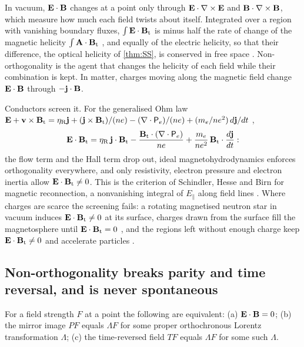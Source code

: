 In vacuum, $\mathbf E\cdot\mathbf B$ changes at a point only through $\mathbf E\cdot\nabla\times\mathbf E$ and $\mathbf B\cdot\nabla\times\mathbf B$, which measure how much each field
twists about itself. Integrated over a region with vanishing boundary fluxes, $\int\mathbf E\cdot\mathbf B_{\rm t}$ is minus half the rate of change of
the magnetic helicity $\int\mathbf A\cdot\mathbf B_{\rm t}$ \cite{Woltjer58,BergerField84}, and equally of the electric helicity, so that their
difference, the optical helicity of \cref{thm:SS}, is conserved in free space \cite{Calkin65,CameronBarnettYao12}. Non-orthogonality
is the agent that changes the helicity of each field while their combination is kept. In matter, charges moving along the magnetic field
change $\mathbf E\cdot\mathbf B$ through $-\mathbf j\cdot\mathbf B$.

Conductors screen it. For the generalised Ohm law
$\mathbf E+\mathbf v\times\mathbf B_{\rm t}=\eta_{\rm R}\mathbf j+(\mathbf j\times\mathbf B_{\rm t})/(ne)-(\nabla\cdot\mathsf P_e)/(ne)+(m_e/ne^2)\,d\mathbf j/dt$ \cite{PriestForbes},
\[
\mathbf E\cdot\mathbf B_{\rm t}=\eta_{\rm R}\,\mathbf j\cdot\mathbf B_{\rm t}-\frac{\mathbf B_{\rm t}\cdot(\nabla\cdot\mathsf P_e)}{ne}+\frac{m_e}{ne^2}\,\mathbf B_{\rm t}\cdot\frac{d\mathbf j}{dt} :
\]
the flow term and the Hall term drop out, ideal magnetohydrodynamics enforces orthogonality everywhere, and only resistivity, electron
pressure and electron inertia allow $\mathbf E\cdot\mathbf B_{\rm t}\neq0$. This is the criterion of Schindler, Hesse and Birn for magnetic reconnection,
a nonvanishing integral of $E_\parallel$ along field lines \cite{SchindlerHesseBirn88}. Where charges are scarce the screening fails: a
rotating magnetised neutron star in vacuum induces $\mathbf E\cdot\mathbf B_{\rm t}\neq0$ at its surface, charges drawn from the surface fill the
magnetosphere until $\mathbf E\cdot\mathbf B_{\rm t}=0$ \cite{GoldreichJulian69}, and the regions left without enough charge keep $\mathbf E\cdot\mathbf B_{\rm t}\neq0$ and
accelerate particles \cite{RudermanSutherland75}.

\subsection{Non-orthogonality breaks parity and time reversal, and is never spontaneous}

\begin{theorem}
\label{thm:achiral}
For a field strength $F$ at a point the following are equivalent: (a) $\mathbf E\cdot\mathbf B=0$; (b) the mirror image $PF$ equals $\Lambda F$ for some
proper orthochronous Lorentz transformation $\Lambda$; (c) the time-reversed field $TF$ equals $\Lambda F$ for some such $\Lambda$.
\end{theorem}

